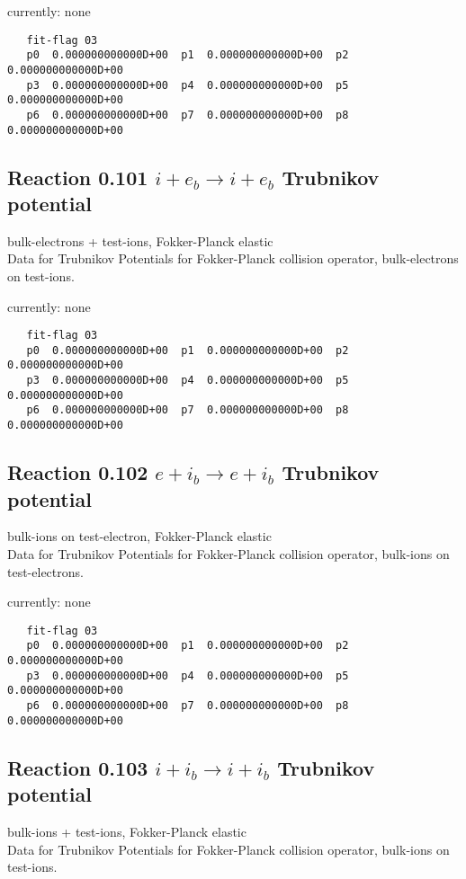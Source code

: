 \documentclass[12pt,dvipdfmx]{article}
\begin{document}
currently: none


\begin{small}\begin{verbatim}
   fit-flag 03
   p0  0.000000000000D+00  p1  0.000000000000D+00  p2  0.000000000000D+00
   p3  0.000000000000D+00  p4  0.000000000000D+00  p5  0.000000000000D+00
   p6  0.000000000000D+00  p7  0.000000000000D+00  p8  0.000000000000D+00
\end{verbatim}\end{small}

\subsection{
Reaction 0.101  $ i + e_b \rightarrow i + e_b$ Trubnikov potential}
bulk-electrons + test-ions, Fokker-Planck elastic \\
Data for Trubnikov Potentials for Fokker-Planck collision
operator, bulk-electrons on test-ions.

currently: none


\begin{small}\begin{verbatim}
   fit-flag 03
   p0  0.000000000000D+00  p1  0.000000000000D+00  p2  0.000000000000D+00
   p3  0.000000000000D+00  p4  0.000000000000D+00  p5  0.000000000000D+00
   p6  0.000000000000D+00  p7  0.000000000000D+00  p8  0.000000000000D+00
\end{verbatim}\end{small}

\subsection{
Reaction 0.102 $ e + i_b \rightarrow e + i_b$ Trubnikov potential}
bulk-ions on test-electron, Fokker-Planck elastic \\
Data for Trubnikov Potentials for Fokker-Planck collision
operator, bulk-ions on test-electrons.


currently: none

\begin{small}\begin{verbatim}
   fit-flag 03
   p0  0.000000000000D+00  p1  0.000000000000D+00  p2  0.000000000000D+00
   p3  0.000000000000D+00  p4  0.000000000000D+00  p5  0.000000000000D+00
   p6  0.000000000000D+00  p7  0.000000000000D+00  p8  0.000000000000D+00
\end{verbatim}\end{small}

\subsection{
Reaction 0.103 $ i + i_b \rightarrow i + i_b$ Trubnikov potential}
bulk-ions + test-ions, Fokker-Planck elastic \\
Data for Trubnikov Potentials for Fokker-Planck collision
operator, bulk-ions on test-ions.
\end{document}
